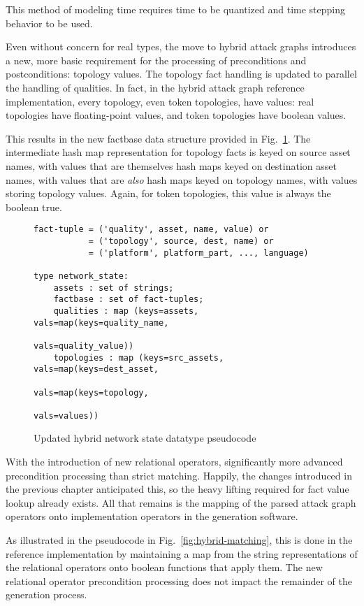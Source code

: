 This method of modeling time requires time to be quantized and time stepping
behavior to be used.

Even without concern for real types, the move to hybrid attack graphs 
introduces a new, more basic requirement for the processing of preconditions
and postconditions: topology values. The topology fact handling is updated
to parallel the handling of qualities. In fact, in the hybrid attack graph
reference implementation, every topology, even token topologies, have values:
real topologies have floating-point values, and token topologies have boolean
values.

This results in the new factbase data structure provided in 
Fig.~\ref{fig:netstate_map_hybrid_pc}. The intermediate hash map representation
for topology facts is keyed on source asset names, with values that are
themselves hash maps keyed on destination asset names, with values that are
\emph{also} hash maps keyed on topology names, with values storing topology
values. Again, for token topologies, this value is always the boolean true.

\begin{figure}
\begin{lstlisting}
fact-tuple = ('quality', asset, name, value) or
           = ('topology', source, dest, name) or
           = ('platform', platform_part, ..., language)

type network_state:
    assets : set of strings;
    factbase : set of fact-tuples;
    qualities : map (keys=assets, vals=map(keys=quality_name,
                                           vals=quality_value))
    topologies : map (keys=src_assets, vals=map(keys=dest_asset,
                                                vals=map(keys=topology,
                                                         vals=values))
\end{lstlisting}
\caption{Updated hybrid network state datatype pseudocode}
\label{fig:netstate_map_hybrid_pc}
\end{figure}
With the introduction of new relational operators, significantly more advanced
precondition processing than strict matching. Happily, the changes introduced
in the previous chapter anticipated this, so the heavy lifting required for
fact value lookup already exists. All that remains is the mapping of the
parsed attack graph operators onto implementation operators in the generation
software.

As illustrated in the pseudocode in Fig.~\ref{fig:hybrid-matching}, this is
done in the reference implementation by maintaining a map from the string
representations of the relational operators onto boolean functions that apply
them. The new relational operator precondition processing does not impact the
remainder of the generation process.

